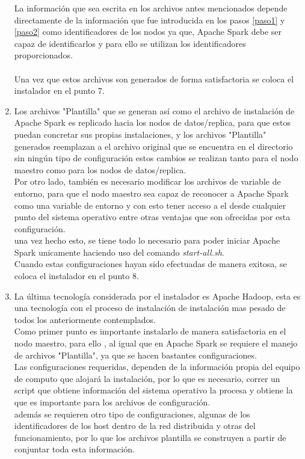 \begin{enumerate}
	La información que sea escrita en los archivos antes mencionados depende directamente de la información que fue introducida en los pasos \ref{paso1} y \ref{paso2} como identificadores de los nodos ya que, Apache Spark debe ser capaz de identificarlos y para ello se utilizan los identificadores proporcionados.\\
	\\
	Una vez que estos archivos son generados de forma satisfactoria se coloca el instalador en el punto 7.
	\item 
	Los archivos "Plantilla" que se generan así como el archivo de instalación de Apache Spark es replicado hacia los nodos de datos/replica, para que estos puedan concretar sus propias instalaciones, y los archivos "Plantilla" generados reemplazan a el archivo original que se encuentra en el directorio sin ningún tipo de configuración estos cambios se realizan tanto para el nodo maestro como para los nodos de datos/replica. 
	\\
	Por otro lado, también es necesario modificar los archivos de variable de entorno, para que el nodo maestro sea capaz de reconocer a Apache Spark como una variable de entorno y con esto tener acceso a el desde cualquier punto del sistema operativo entre otras ventajas que son ofrecidas por esta configuración.\\
	una vez hecho esto, se tiene todo lo necesario para poder iniciar Apache Spark unicamente haciendo uso del comando \emph{start-all.sh}.
	\\
	Cuando estas configuraciones hayan sido efectuadas de manera exitosa, se coloca el instalador en el punto 8.
	\item La última tecnología considerada por el instalador es Apache Hadoop, esta es una tecnología con el proceso de instalación de instalación mas pesado de todos los anteriormente contemplados. \\
	Como primer punto es importante instalarlo de manera satisfactoria en el nodo maestro, para ello , al igual que en Apache Spark se requiere el manejo de archivos "Plantilla", ya que se hacen bastantes configuraciones. \\
	Las configuraciones requeridas, dependen de la información propia del equipo de computo que alojará la instalación, por lo que es necesario, correr un script que obtiene información del sistema operativo la procesa y obtiene la que es importante para los archivos de configuración.
	\\
	además se requieren otro tipo de configuraciones, algunas de los identificadores de los host dentro de la red distribuida y otras del funcionamiento, por lo que los archivos plantilla se construyen a partir de conjuntar toda esta información.\\

\end{enumerate}
